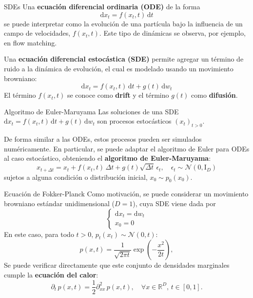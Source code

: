 \documentclass{beamer}
\newcommand{\R}{\mathbb{R}}
\begin{document}
\begin{frame}{SDEs}
    Una \textbf{ecuación diferencial ordinaria (ODE)} de la forma
    \begin{equation*}
        \text{d}x_t = f(x_t,t)\,\text{d}t
    \end{equation*}
    se puede interpretar como la evolución de una partícula bajo la influencia de un campo de velocidades, $f(x_t,t)$. Este tipo de dinámicas se observa, por ejemplo, en flow matching.

    Una \textbf{ecuación diferencial estocástica (SDE)} permite agregar un término de ruido a la dinámica de evolución, el cual es modelado usando un movimiento browniano:
    \begin{equation*}
        \text{d}x_t = f(x_t,t)\,\text{d}t + g(t)\,\text{d}w_t
    \end{equation*}
    El término $f(x_t,t)$ se conoce como \textbf{drift} y el término $g(t)$ como \textbf{difusión}.
\end{frame}

\begin{frame}{Algoritmo de Euler-Maruyama}
    Las soluciones de una SDE $\text{d}x_t = f(x_t,t)\,\text{d}t + g(t)\,\text{d}w_t$ son procesos estocásticos $(x_t)_{t>0}$.

    De forma similar a las ODEs, estos procesos pueden ser simulados numéricamente. En particular, se puede adaptar el algoritmo de Euler para ODEs al caso estocástico, obteniendo el \textbf{algoritmo de Euler-Maruyama}:
    \begin{equation*}
        x_{t+\Delta t} = x_t + f(x_t,t)\,\Delta t + g(t)\sqrt{\Delta t}\,\epsilon_t,
        \quad \epsilon_t\sim\mathcal{N}(0,\text{I}_D)
    \end{equation*}
    sujetos a alguna condición o distribución inicial, $x_0\sim p_0(x_0)$.
\end{frame}

\begin{frame}{Ecuación de Fokker-Planck}
    Como motivación, se puede considerar un movimiento browniano estándar unidimensional ($D=1$), cuya SDE viene dada por
    \begin{equation*}
        \begin{cases}
            \text{d}x_t=\text{d}w_t \\
            x_0=0
        \end{cases}
    \end{equation*}
    En este caso, para todo $t>0$, $p_t(x_t)\sim\mathcal{N}(0,t)$:
    \begin{equation*}
        p(x,t)=\frac{1}{\sqrt{2\pi t}}\exp\left(-\frac{x^2}{2t}\right),
    \end{equation*}
    Se puede verificar directamente que este conjunto de densidades marginales cumple la \textbf{ecuación del calor}:
    \begin{equation*}
        \partial_t\,p(x,t) = \frac{1}{2}\partial^2_{xx}\, p(x,t),
        \quad\forall x\in\R^D,\,t\in[0,1].
    \end{equation*}
\end{frame}
\end{document}
